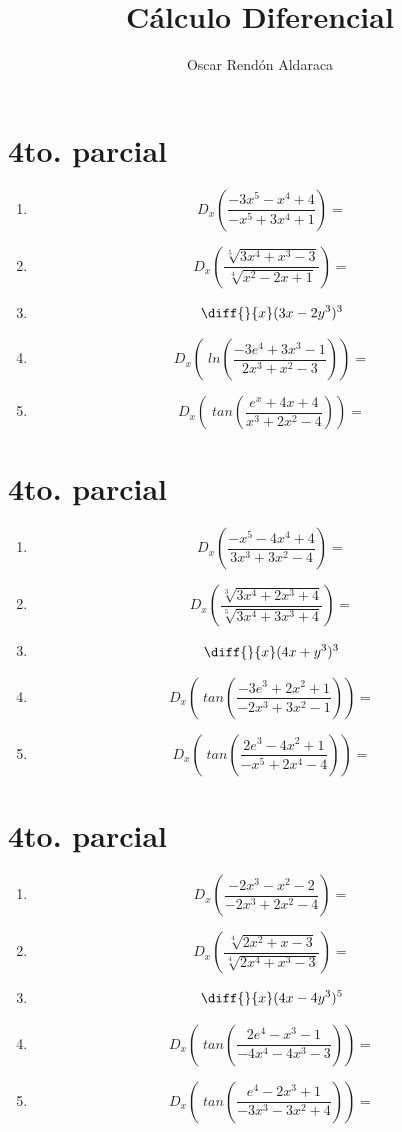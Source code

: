\documentclass[oneside,spanish,letter]{article}
\begin{document}
\title{Cálculo Diferencial}

\author{Oscar Rendón Aldaraca}

\section{4to. parcial}
\begin{enumerate}
 \item $$ D_x \left( \frac{-3x^5-x^4+4}{-x^5+3x^4+1}\right)=$$
 \item $$ D_x \left( \frac{\sqrt[5]{3x^4+x^3-3}}{\sqrt[4]{x^2-2x+1}}\right)=$$
\item $$\diff{}{x}(3x-2y^3)^3$$
 \item $$ D_x \left(\;ln\left( \frac{-3e^4+3x^3-1}{2x^3+x^2-3}\right)\right)=$$
 \item $$ D_x \left(\;tan\left( \frac{e^x+4x+4}{x^3+2x^2-4}\right)\right)=$$
 \end{enumerate}
  \newpage
\section{4to. parcial}
\begin{enumerate}
 \item $$ D_x \left( \frac{-x^5-4x^4+4}{3x^3+3x^2-4}\right)=$$
 \item $$ D_x \left( \frac{\sqrt[3]{3x^4+2x^3+4}}{\sqrt[5]{3x^4+3x^3+4}}\right)=$$
\item $$\diff{}{x}(4x+y^3)^3$$
 \item $$ D_x \left(\;tan\left( \frac{-3e^3+2x^2+1}{-2x^3+3x^2-1}\right)\right)=$$
 \item $$ D_x \left(\;tan\left( \frac{2e^3-4x^2+1}{-x^5+2x^4-4}\right)\right)=$$
 \end{enumerate}
  \newpage
\section{4to. parcial}
\begin{enumerate}
 \item $$ D_x \left( \frac{-2x^3-x^2-2}{-2x^3+2x^2-4}\right)=$$
 \item $$ D_x \left( \frac{\sqrt[4]{2x^2+x-3}}{\sqrt[4]{2x^4+x^3-3}}\right)=$$
\item $$\diff{}{x}(4x-4y^3)^5$$
 \item $$ D_x \left(\;tan\left( \frac{2e^4-x^3-1}{-4x^4-4x^3-3}\right)\right)=$$
 \item $$ D_x \left(\;tan\left( \frac{e^4-2x^3+1}{-3x^3-3x^2+4}\right)\right)=$$
 \end{enumerate}
  \newpage
\end{document}
